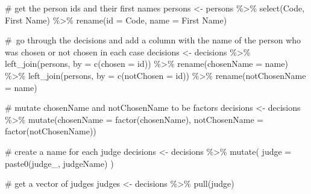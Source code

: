 \documentclass[
  letterpaper,
  DIV=11,
  numbers=noendperiod]{scrreprt}
\newenvironment{Shaded}{\begin{snugshade}}{\end{snugshade}}
\newcommand{\AttributeTok}[1]{\textcolor[rgb]{0.40,0.45,0.13}{#1}}
\newcommand{\CommentTok}[1]{\textcolor[rgb]{0.37,0.37,0.37}{#1}}
\newcommand{\FunctionTok}[1]{\textcolor[rgb]{0.28,0.35,0.67}{#1}}
\newcommand{\NormalTok}[1]{\textcolor[rgb]{0.00,0.23,0.31}{#1}}
\newcommand{\OtherTok}[1]{\textcolor[rgb]{0.00,0.23,0.31}{#1}}
\newcommand{\SpecialCharTok}[1]{\textcolor[rgb]{0.37,0.37,0.37}{#1}}
\newcommand{\StringTok}[1]{\textcolor[rgb]{0.13,0.47,0.30}{#1}}
\begin{document}
\begin{Shaded}
\begin{Highlighting}[]
\CommentTok{\# get the person ids and their first names}
\NormalTok{persons }\OtherTok{\textless{}{-}}\NormalTok{ persons }\SpecialCharTok{\%\textgreater{}\%} 
  \FunctionTok{select}\NormalTok{(Code, }\StringTok{\textasciigrave{}}\AttributeTok{First Name}\StringTok{\textasciigrave{}}\NormalTok{) }\SpecialCharTok{\%\textgreater{}\%} 
  \FunctionTok{rename}\NormalTok{(}\AttributeTok{id =}\NormalTok{ Code, }\AttributeTok{name =} \StringTok{\textasciigrave{}}\AttributeTok{First Name}\StringTok{\textasciigrave{}}\NormalTok{)}

\CommentTok{\# go through the decisions and add a column with the name of the person who was chosen or not chosen in each case}
\NormalTok{decisions }\OtherTok{\textless{}{-}}\NormalTok{ decisions }\SpecialCharTok{\%\textgreater{}\%} \FunctionTok{left\_join}\NormalTok{(persons, }\AttributeTok{by =} \FunctionTok{c}\NormalTok{(}\StringTok{\textquotesingle{}chosen\textquotesingle{}} \OtherTok{=} \StringTok{\textquotesingle{}id\textquotesingle{}}\NormalTok{)) }\SpecialCharTok{\%\textgreater{}\%} 
  \FunctionTok{rename}\NormalTok{(}\AttributeTok{chosenName =}\NormalTok{ name) }\SpecialCharTok{\%\textgreater{}\%} 
  \FunctionTok{left\_join}\NormalTok{(persons, }\AttributeTok{by =} \FunctionTok{c}\NormalTok{(}\StringTok{\textquotesingle{}notChosen\textquotesingle{}} \OtherTok{=} \StringTok{\textquotesingle{}id\textquotesingle{}}\NormalTok{)) }\SpecialCharTok{\%\textgreater{}\%} 
  \FunctionTok{rename}\NormalTok{(}\AttributeTok{notChosenName =}\NormalTok{ name)}

\CommentTok{\# mutate chosenName and notChosenName to be factors}
\NormalTok{decisions }\OtherTok{\textless{}{-}}\NormalTok{ decisions }\SpecialCharTok{\%\textgreater{}\%} 
  \FunctionTok{mutate}\NormalTok{(}\AttributeTok{chosenName =} \FunctionTok{factor}\NormalTok{(chosenName), }\AttributeTok{notChosenName =} \FunctionTok{factor}\NormalTok{(notChosenName))}

\CommentTok{\# create a name for each judge}
\NormalTok{decisions }\OtherTok{\textless{}{-}}\NormalTok{ decisions }\SpecialCharTok{\%\textgreater{}\%} \FunctionTok{mutate}\NormalTok{(}
    \AttributeTok{judge =} \FunctionTok{paste0}\NormalTok{(}\StringTok{\textquotesingle{}judge\_\textquotesingle{}}\NormalTok{, judgeName)}
\NormalTok{)}

\CommentTok{\# get a vector of judges}
\NormalTok{judges }\OtherTok{\textless{}{-}}\NormalTok{ decisions }\SpecialCharTok{\%\textgreater{}\%} \FunctionTok{pull}\NormalTok{(judge)}


\end{Highlighting}
\end{Shaded}
\end{document}
